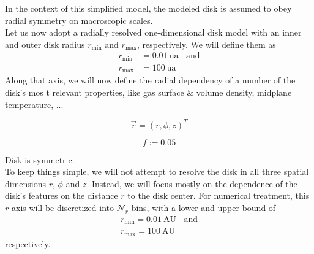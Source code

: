 

    In the context of this simplified model, the modeled disk is assumed to obey 
    radial symmetry on macroscopic scales. \\
    
    Let us now adopt a radially resolved one-dimensional disk model 
    with an inner and outer disk radius $r_\text{min}$ and $r_\text{max}$, respectively.
    We will define them as
    \begin{align}
        r_\text{min} &= \SI{0.01}{\astronomicalunit}
        \ \ \ \ \text{and} 
        \\
        r_\text{max} &= \SI{100}{\astronomicalunit}
    \end{align}
    Along that axis, we will now define the radial dependency of a number of the disk's mos
    t relevant properties, like gas surface \& volume density, midplane temperature, ...

   \begin{equation}
       \vec r = (r, \phi, z)^T
   \end{equation}

    \begin{equation}
        f := 0.05
    \end{equation}

    Disk is symmetric. \\

    To keep things simple, we will not attempt to resolve the disk in all three spatial 
    dimensions $r$, $\phi$ and $z$. Instead, we will focus mostly on the dependence of the 
    disk's features on the distance $r$ to the disk center.
    For numerical treatment, this $r$-axis will be discretized into $\mathcal N_r$ bins,
    with a lower and upper bound of
    \begin{align}
        r_\text{min} = 0.01\ \text{AU} 
        \ \ \ \ \text{and} \\
        r_\text{max} = 100\ \text{AU}
    \end{align}
    respectively. \\

